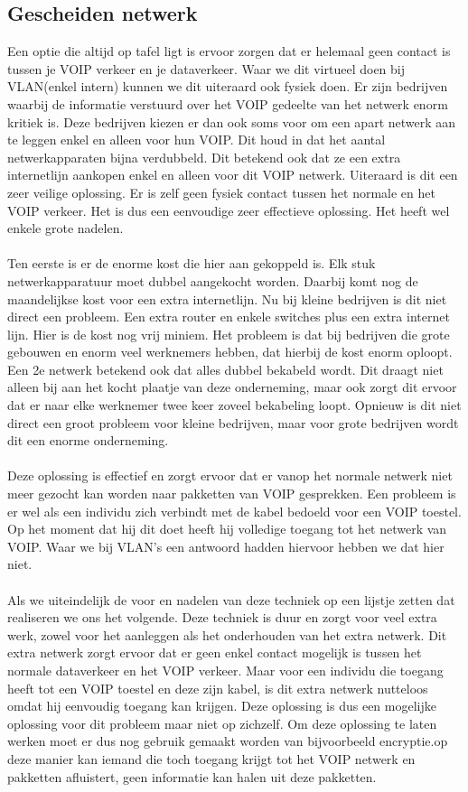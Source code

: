 \documentclass[pdftex,a4paper,12pt,twoside]{report}
\begin{document}
\subsection{Gescheiden netwerk}
Een optie die altijd op tafel ligt is ervoor zorgen dat er helemaal geen contact is tussen je VOIP verkeer en je dataverkeer. Waar we dit virtueel doen bij VLAN(enkel intern) kunnen we dit uiteraard ook fysiek doen. Er zijn bedrijven waarbij de informatie verstuurd over het VOIP gedeelte van het netwerk enorm kritiek is. Deze bedrijven kiezen er dan ook soms voor om een apart netwerk aan te leggen enkel en alleen voor hun VOIP. Dit houd in dat het aantal netwerkapparaten bijna verdubbeld. Dit betekend ook dat ze een extra internetlijn aankopen enkel en alleen voor dit VOIP netwerk. Uiteraard is dit een zeer veilige oplossing. Er is zelf geen fysiek contact tussen het normale en het VOIP verkeer. Het is dus een eenvoudige zeer effectieve oplossing. Het heeft wel enkele grote nadelen.
\\ \\
Ten eerste is er de enorme kost die hier aan gekoppeld is. Elk stuk netwerkapparatuur moet dubbel aangekocht worden. Daarbij komt nog de maandelijkse kost voor een extra internetlijn. Nu bij kleine bedrijven is dit niet direct een probleem. Een extra router en enkele switches plus een extra internet lijn. Hier is de kost nog vrij miniem. Het probleem is dat bij bedrijven die grote gebouwen en enorm veel werknemers hebben, dat hierbij de kost enorm oploopt.\\
Een 2e netwerk betekend ook dat alles dubbel bekabeld wordt. Dit draagt niet alleen bij aan het kocht plaatje van deze onderneming, maar ook zorgt dit ervoor dat er naar elke werknemer twee keer zoveel bekabeling loopt. Opnieuw is dit niet direct een groot probleem voor kleine bedrijven, maar voor grote bedrijven wordt dit een enorme onderneming. 
\\ \\
Deze oplossing is effectief en zorgt ervoor dat er vanop het normale netwerk niet meer gezocht kan worden naar pakketten van VOIP gesprekken. Een probleem is er wel als een individu zich verbindt met de kabel bedoeld voor een VOIP toestel. Op het moment dat hij dit doet heeft hij volledige toegang tot het netwerk van VOIP. Waar we bij VLAN's een antwoord hadden hiervoor hebben we dat hier niet. 
\\ \\
Als we uiteindelijk de voor en nadelen van deze techniek op een lijstje zetten dat realiseren we ons het volgende. Deze techniek is duur en zorgt voor veel extra werk, zowel voor het aanleggen als het onderhouden van het extra netwerk. Dit extra netwerk zorgt ervoor dat er geen enkel contact mogelijk is tussen het normale dataverkeer en het VOIP verkeer. Maar voor een individu die toegang heeft tot een VOIP toestel en deze zijn kabel, is dit extra netwerk nutteloos omdat hij eenvoudig toegang kan krijgen. Deze oplossing is dus een mogelijke oplossing voor dit probleem maar niet op zichzelf. Om deze oplossing te laten werken moet er dus nog gebruik gemaakt worden van bijvoorbeeld encryptie.op deze manier kan iemand die toch toegang krijgt tot het VOIP netwerk en pakketten afluistert, geen informatie kan halen uit deze pakketten.
\end{document}
